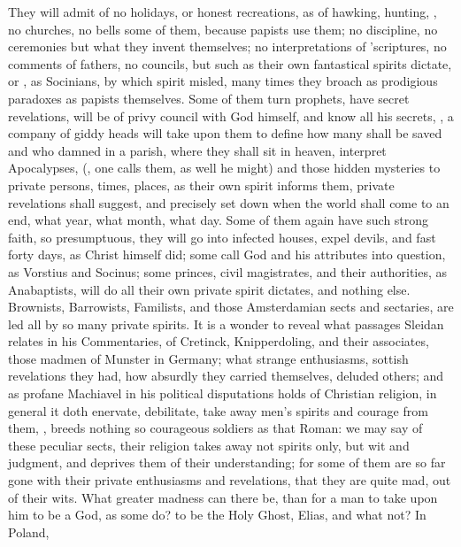 {They will admit of no holidays, or honest recreations, as of hawking,
hunting, \etc{}, no churches, no bells some of them, because papists use
them; no discipline, no ceremonies but what they invent themselves; no
interpretations of 'scriptures, no comments of fathers, no councils,
but such as their own fantastical spirits dictate, or , as
Socinians, by which spirit misled, many times they broach as prodigious
paradoxes as papists themselves. Some of them turn prophets, have
secret revelations, will be of privy council with God himself, and know
all his secrets,  , a company of giddy heads
will take upon them to define how many shall be saved and who damned in
a parish, where they shall sit in heaven, interpret Apocalypses,
(, one calls them, as well he
might) and those hidden mysteries to private persons, times, places, as
their own spirit informs them, private revelations shall suggest, and
precisely set down when the world shall come to an end, what year, what
month, what day. Some of them again have such strong faith, so
presumptuous, they will go into infected houses, expel devils, and fast
forty days, as Christ himself did; some call God and his attributes
into question, as Vorstius and Socinus; some princes, civil
magistrates, and their authorities, as Anabaptists, will do all their
own private spirit dictates, and nothing else. Brownists, Barrowists,
Familists, and those Amsterdamian sects and sectaries, are led all by
so many private spirits. It is a wonder to reveal what passages Sleidan
relates in his Commentaries, of Cretinck, Knipperdoling, and their
associates, those madmen of Munster in Germany; what strange
enthusiasms, sottish revelations they had, how absurdly they carried
themselves, deluded others; and as profane Machiavel in his political
disputations holds of Christian religion, in general it doth enervate,
debilitate, take away men's spirits and courage from them, , breeds nothing so courageous soldiers as that Roman: we
may say of these peculiar sects, their religion takes away not spirits
only, but wit and judgment, and deprives them of their understanding;
for some of them are so far gone with their private enthusiasms and
revelations, that they are quite mad, out of their wits. What greater
madness can there be, than for a man to take upon him to be a God, as
some do? to be the Holy Ghost, Elias, and what not? In Poland,
}
